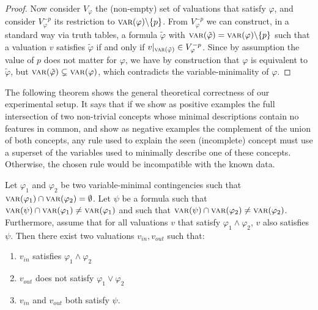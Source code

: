 \begin{appendices}
\begin{proof}
Now consider $V_\varphi$ the (non-empty) set of valuations that satisfy $\varphi$, and consider $V^{-p}_\varphi$ its restriction to $\textsc{var}(\varphi) \backslash\{p\}$. From $V^{-p}_\varphi$ we can construct, in a standard way via truth tables, a formula $\tilde{\varphi}$ with $\textsc{var}(\tilde{\varphi}) = \textsc{var}(\varphi) \backslash\{p\}$ such that a valuation $v$ satisfies $\tilde{\varphi}$ if and only if $v|_{ \textsc{var}(\tilde{\varphi})} \in V^{-p}_\varphi$. Since by assumption the value of $p$ does not matter for $\varphi$, we have by construction that $\varphi$ is equivalent to $\tilde{\varphi}$, but $\textsc{var}(\tilde{\varphi}) \subsetneq \textsc{var}(\varphi)$, which contradicts the variable-minimality of $\varphi$.
\end{proof}


The following theorem shows the general theoretical correctness of our experimental setup. 
It says that if we show as positive examples the full intersection of two non-trivial concepts whose minimal descriptions contain no features in common, and show as negative examples the complement of the union of both concepts, any rule used to explain the seen (incomplete) concept must use a superset of the variables used to minimally describe one of these concepts. Otherwise, the chosen rule would be incompatible with the known data.  

\begin{theorem}\label{theorem:TeoremaPrincipal}
Let $\varphi_1$ and $\varphi_2$ be two variable-minimal contingencies such that $\textsc{var}(\varphi_1)\cap \textsc{var}(\varphi_2) = \emptyset$. Let $\psi$ be a formula such that $\textsc{var}(\psi) \cap \textsc{var}(\varphi_1) \neq \textsc{var}(\varphi_1)$ and such that $\textsc{var}(\psi) \cap \textsc{var}(\varphi_2) \neq \textsc{var}(\varphi_2)$. 
Furthermore, assume that for all valuations $v$ that satisfy $\varphi_1 \land \varphi_2$, $v$ also satisfies $\psi$. 
Then there exist two valuations $v_{in}, v_{out}$ such that:
\begin{enumerate}
    \item \label{item:v1EnInterseccion} $v_{in}$ satisfies $\varphi_1 \land \varphi_2$
    \item $v_{out}$ does not satisfy $\varphi_1 \lor \varphi_2$ %
    \item $v_{in}$ and $v_{out}$ both satisfy $\psi$.
\end{enumerate}
\end{theorem}


\end{appendices}
